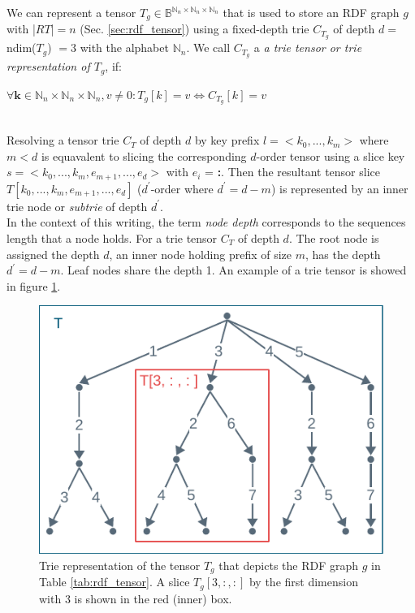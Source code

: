 We can represent a tensor $T_g \in \mathbb{B}^{\mathbb{N}_n \times \mathbb{N}_n \times \mathbb{N}_n}$ that is used to store an RDF graph $g$ with |$RT$|$=n$ (Sec. \ref{sec:rdf_tensor}) using a fixed-depth trie $C_{T_g}$ of depth $d = $ ndim($T_g$) $=3$ with the alphabet $\mathbb{N}_n$. We call $C_{T_g}$ a \textit{a trie tensor or trie representation of $T_g$}, if: \\
\centerline{$\forall \textbf{k} \in \mathbb{N}_n \times \mathbb{N}_n \times \mathbb{N}_n, v \neq 0: T_g[k] = v \iff C_{T_g}[k] = v$}\\

Resolving a tensor trie $C_T$ of depth $d$ by key prefix $l = <k_0, ..., k_m>$ where $m<d$ is equavalent to slicing the corresponding $d$-order tensor using a slice key $s = <k_0, ..., k_m, e_{m+1}, ...,e_d>$ with $e_i$ = \textbf{:}. Then the resultant tensor slice $T[k_0, ..., k_m, e_{m+1}, ...,e_d]$ ($d^{'}$-order where $d^{'}=d-m$) is represented by an inner trie node or \textit{subtrie} of depth $d^{'}$. \\

In the context of this writing, the term \textit{node depth} corresponds to the sequences length that a node holds. For a trie tensor $C_T$ of depth $d$. The root node is assigned the depth $d$, an inner node holding prefix of size $m$, has the depth $d^{'}=d-m$. Leaf nodes share the depth 1. An example of a trie tensor is showed in figure \ref{fig:rdf_trie}.  \\

\begin{figure}[h]
	\centering
	\includegraphics{figures/chapter2/trie4}
	\caption{Trie representation of the tensor $T_g$ that depicts the RDF graph $g$ in  Table \ref{tab:rdf_tensor}. A slice $T_g[3, :, :]$ by the first dimension with 3 is shown in the red (inner) box.}
	\label{fig:rdf_trie}
\end{figure}
\clearpage


